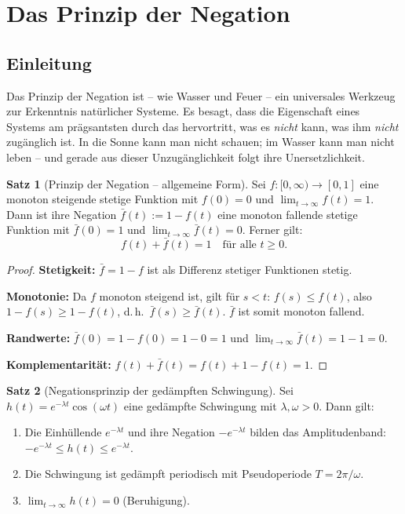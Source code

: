 ﻿\documentclass[a4paper,12pt]{article}
\theoremstyle{definition}
\newtheorem{satz}{Satz}
\begin{document}
\section{Das Prinzip der Negation}
\label{sec:negation}

\subsection{Einleitung}

Das Prinzip der Negation ist -- wie Wasser und Feuer -- ein universales Werkzeug
zur Erkenntnis nat\"urlicher Systeme. Es besagt, dass die Eigenschaft eines Systems
am pr\"agsantsten durch das hervortritt, was es \emph{nicht} kann, was ihm
\emph{nicht} zug\"anglich ist. In die Sonne kann man nicht schauen; im Wasser kann
man nicht leben -- und gerade aus dieser Unzug\"anglichkeit folgt ihre Unersetzlichkeit.

\begin{satz}[Prinzip der Negation -- allgemeine Form]
\label{satz:negation}
    Sei $f : [0,\infty) \to [0,1]$ eine monoton steigende stetige Funktion mit
    $f(0) = 0$ und $\lim_{t\to\infty} f(t) = 1$. Dann ist ihre Negation
    $\bar{f}(t) := 1 - f(t)$ eine monoton fallende stetige Funktion mit
    $\bar{f}(0) = 1$ und $\lim_{t\to\infty} \bar{f}(t) = 0$. Ferner gilt:
    \[
        f(t) + \bar{f}(t) = 1 \quad \text{f\"ur alle } t \geq 0.
    \]
\end{satz}

\begin{proof}
    \textbf{Stetigkeit:} $\bar{f} = 1 - f$ ist als Differenz stetiger Funktionen stetig.

    \textbf{Monotonie:} Da $f$ monoton steigend ist, gilt f\"ur $s < t$:
    $f(s) \leq f(t)$, also $1 - f(s) \geq 1 - f(t)$, d.\,h.\ $\bar{f}(s) \geq \bar{f}(t)$.
    $\bar{f}$ ist somit monoton fallend.

    \textbf{Randwerte:} $\bar{f}(0) = 1 - f(0) = 1 - 0 = 1$ und
    $\lim_{t\to\infty}\bar{f}(t) = 1 - 1 = 0$.

    \textbf{Komplementarit\"at:} $f(t) + \bar{f}(t) = f(t) + 1 - f(t) = 1$. \qedhere
\end{proof}

\begin{satz}[Negationsprinzip der ged\"ampften Schwingung]
\label{satz:gedaempft}
    Sei $h(t) = e^{-\lambda t}\cos(\omega t)$ eine ged\"ampfte Schwingung mit
    $\lambda, \omega > 0$. Dann gilt:
    \begin{enumerate}
        \item Die Einhüllende $e^{-\lambda t}$ und ihre Negation $-e^{-\lambda t}$
              bilden das Amplitudenband: $-e^{-\lambda t} \leq h(t) \leq e^{-\lambda t}$.
        \item Die Schwingung ist ged\"ampft periodisch mit Pseudoperiode $T = 2\pi/\omega$.
        \item $\lim_{t\to\infty} h(t) = 0$ (Beruhigung).
    \end{enumerate}
\end{satz}
\end{document}
